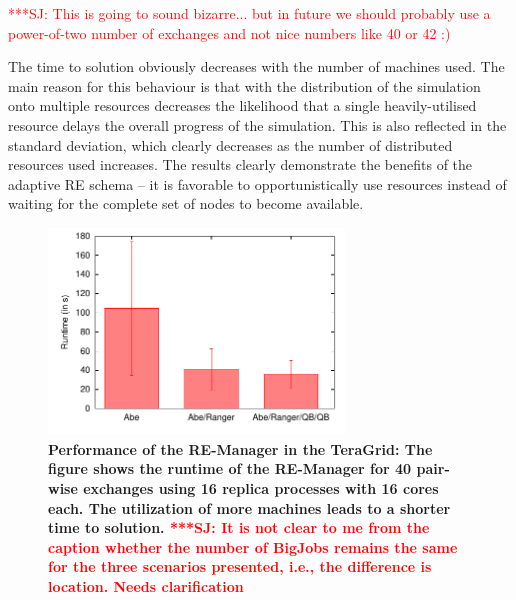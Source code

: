 \documentclass{rspublic}
\newcommand{\jhanote}[1]{ {\textcolor{red} { ***SJ: #1 }}}
\newcommand{\jhanote}[1]{}
\begin{document}
{\jhanote{This is going to sound bizarre... but in future we should
  probably use a power-of-two number of exchanges and not nice numbers
  like 40 or 42 :)}


The time to solution obviously decreases with the number of machines
used. The main reason for this behaviour is that with the distribution
of the simulation onto multiple resources decreases the likelihood
that a single heavily-utilised resource delays the overall progress of
the simulation. This is also reflected in the standard deviation,
which clearly decreases as the number of distributed resources used
increases. The results clearly demonstrate the benefits of the
adaptive RE schema -- it is favorable to opportunistically use
resources instead of waiting for the complete set of nodes to become
available.

\begin{figure}[t]
    \centering
       \includegraphics[width=0.7\textwidth]{performance/perf_distributed.pdf}
       \caption{\footnotesize \bf Performance of the RE-Manager in the
         TeraGrid: The figure shows the runtime of the RE-Manager for
         40 pair-wise exchanges using 16 replica processes with 16
         cores each. The utilization of more machines leads to a
         shorter time to solution. \jhanote{It is not clear to me from
           the caption whether the number of BigJobs remains the same
           for the three scenarios presented, i.e., the difference is
           location. Needs clarification} }
    \label{fig:performance_perf_distributed}
\end{figure}

                                              
}
\end{document}
